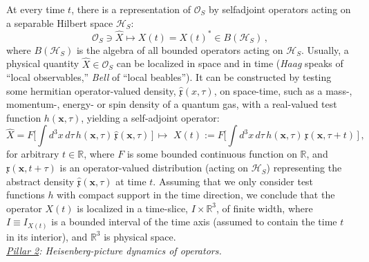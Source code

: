 \documentclass[a4paper,11pt]{article}
\begin{document}
At every time $t$, there is a representation of 
$\mathcal{O}_S$ by selfadjoint operators acting on a separable Hilbert space $\mathcal{H}_S$:
\begin{equation}\label{Rep}
\mathcal{O}_S \ni \hat{X} \mapsto X(t)= X(t)^{*} \in B(\mathcal{H}_S)\,,
\end{equation}
where $B(\mathcal{H}_S)$ is the algebra of all bounded operators acting on $\mathcal{H}_S$. Usually, 
a physical quantity $\hat{X}\in \mathcal{O}_S$ can be localized in space and in time (\textit{Haag} \cite{Haag} speaks of ``local observables,'' \textit{Bell} \cite{Bell} of ``local beables''). It can be constructed by testing some hermitian operator-valued 
density, $\hat{\mathfrak{x}}(x,\tau)$, on space-time, such as a mass-, momentum-, energy- or spin density of a quantum gas, 
with a real-valued test function $h(\mathbf{x},\tau)$, yielding a self-adjoint operator:
\begin{equation}\label{phys quantity}
\hat{X}=F\Big[\int d^{3}x\, d\tau\, h(\mathbf{x},\tau)\, \hat{\mathfrak{x}}(\mathbf{x},\tau)\,\Big]\, \mapsto \,\,
X(t) := F\Big[ \int d^{3}x \, d\tau \,h(\mathbf{x},\tau)\, \mathfrak{x}(\mathbf{x}, \tau+ t)\,\Big]\,,
\end{equation}
for arbitrary $t\in \mathbb{R}$, where $F$ is some bounded continuous function on $\mathbb{R}$, and $\mathfrak{x}(\mathbf{x},t+\tau)$ 
is an operator-valued distribution (acting on $\mathcal{H}_S$) 
representing the abstract density $\hat{\mathfrak{x}}(\mathbf{x}, \tau)$ at time $t$.
Assuming that we only consider test functions $h$ with compact support in the time direction, we conclude that the operator 
$X(t)$ is localized in a time-slice, $I\times \mathbb{R}^{3}$, of finite width, where $I\equiv I_{X(t)}$ is a bounded interval of the 
time axis (assumed to contain the time $t$ in its interior), and $\mathbb{R}^{3}$ is physical space.\\

\textit{\underline{Pillar 2}: Heisenberg-picture dynamics of operators.}
\end{document}
